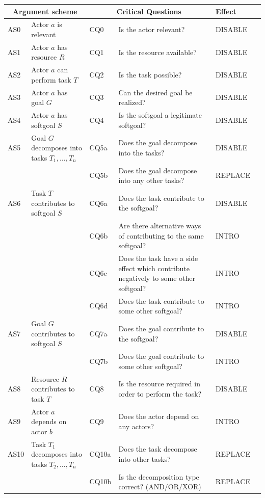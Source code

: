 \begin{table}[h]
\centering
\begin{tabularx}{\textwidth}{|l|l|l|X|l|l|}
\hline
\multicolumn{2}{|c|}{\textbf{Argument scheme}} & \multicolumn{2}{c|}{\textbf{Critical Questions}} & \textbf{Effect}\\
\hline
AS0 & Actor $a$ is relevant & CQ0 &Is the actor relevant? & DISABLE\\
\hline
AS1 & Actor $a$ has resource $R$ & CQ1 &Is the resource available? & DISABLE\\
\hline
AS2 & Actor $a$ can perform task $T$ & CQ2 &Is the task possible? & DISABLE\\
\hline
AS3 & Actor $a$ has goal $G$ & CQ3 & Can the desired goal be realized? & DISABLE\\
\hline
AS4 & Actor $a$ has softgoal $S$ & CQ4 & Is the softgoal a legitimate softgoal?& DISABLE\\
\hline
\hline
AS5 & Goal $G$ decomposes into tasks $T_1,\ldots,T_n$ & CQ5a & Does the goal decompose into the tasks?& DISABLE\\
& & CQ5b & Does the goal decompose into any other tasks?& REPLACE\\
\hline
AS6 & Task $T$ contributes to softgoal $S$& CQ6a & Does the task contribute to the softgoal?& DISABLE\\
&& CQ6b & Are there alternative ways of contributing to the same softgoal?& INTRO \\
&& CQ6c & Does the task have a side effect which contribute negatively to some other softgoal?& INTRO\\
&& CQ6d & Does the task contribute to some other softgoal?& INTRO\\
\hline
AS7 & Goal $G$ contributes to softgoal $S$ & CQ7a & Does the goal contribute to the softgoal?& DISABLE\\
&& CQ7b & Does the goal contribute to some other softgoal?& INTRO\\
\hline
AS8 & Resource $R$ contributes to task $T$ & CQ8 & Is the resource required in order to perform the task?& DISABLE\\
\hline
AS9 & Actor $a$ depends on actor $b$ & CQ9 & Does the actor depend on any actors?& INTRO\\
\hline
AS10 & Task $T_1$ decomposes into tasks $T_2,\ldots,T_n$ & CQ10a & Does the task decompose into other tasks?& REPLACE\\
 &  & CQ10b & Is the decomposition type correct? (AND/OR/XOR)& REPLACE\\

\end{tabularx}
\end{table}
